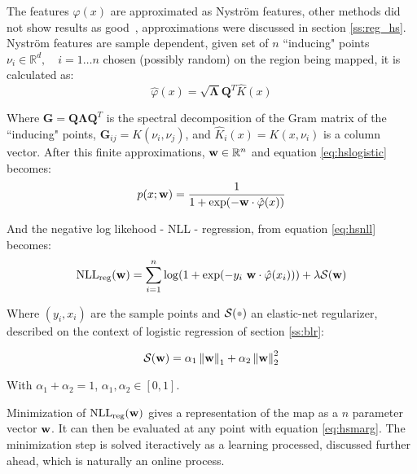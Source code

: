 The features $\varphi(x)$ are approximated as Nystr\"om features, other
methods did not show results as good~\cite{ramos2016hilbert}, approximations
were discussed in section \ref{ss:reg_hs}. Nystr\"om features are sample
dependent, given set of $n$ ``inducing" points $\nu_i\in\mathbb{R}^d, \quad
i=1\ldots n$ chosen (possibly random) on the region being mapped, it is
calculated as:
\begin{equation}
\label{eq:nystrom}
\hat\varphi(x) = \sqrt{\mathbf{\Lambda}}\mathbf{Q}^T\hat K(x)
\end{equation}
 
 Where $\mathbf{G}=\mathbf{Q}\mathbf{\Lambda}\mathbf{Q}^T$ is the
 spectral decomposition of the Gram matrix of the ``inducing" points,
 $\mathbf{G}_{ij}=K(\nu_i,\nu_j)$, and ${\displaystyle\hat K}_i(x) = K(x,\nu_i)$
 is a column vector. After this finite approximations,
 $\mathrm{\mathbf{w}}\in\mathbb{R}^n$ and equation \ref{eq:hslogistic} becomes:
\begin{equation}
\label{eq:hsmarg}
p(x;\mathrm{\mathbf{w}}) = \frac{1}{1+\exp(-\mathrm{\mathbf{w}}\cdot \hat\varphi(x))}
\end{equation}
 
 And the negative log likehood - NLL - regression, from equation \ref{eq:hsnll}
 becomes:
\begin{equation}
\label{eq:finitenll}
\text{NLL}_{\text{reg}}(\mathrm{\mathbf{w}}) =  \sum_{i=1}^n \log(1+\exp(-y_i~
\mathrm{\mathbf{w}}\cdot\hat\varphi(x_i))) +\lambda\mathcal{S}(\mathrm{\mathbf{w}})
\end{equation}
 
 Where $(y_i,x_i)$ are the sample points and $\mathcal{S}(\parm)$ an
 elastic-net regularizer, described on the context of logistic regression of
 section \ref{ss:blr}:
  
\begin{equation}
\label{eq:elasticnet}
\mathcal{S}(\mathrm{\mathbf{w}})=\alpha_1\left\lVert\mathrm{\mathbf{w}}\right\rVert_1 + \alpha_2\left\lVert\mathrm{\mathbf{w}}\right\rVert_2^2
\end{equation}

With $\alpha_1+\alpha_2=1$, $\alpha_1,\alpha_2\in[0,1]$.

Minimization of $\text{NLL}_{\text{reg}}(\mathrm{\mathbf{w}})$ gives a representation of
the map as a $n$ parameter vector $\mathrm{\mathbf{w}}$. It can then be evaluated at any
point with equation \ref{eq:hsmarg}. The minimization step is solved
iteractively as a learning processed, discussed further ahead, which is naturally an online
process.
 
 
